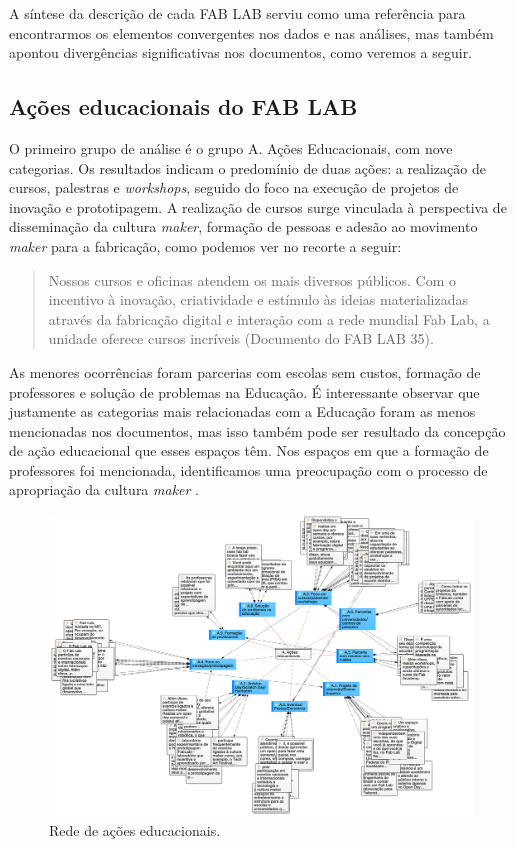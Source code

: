 \documentclass[portuguese]{textolivre}
\begin{document}
A síntese da descrição de cada FAB LAB serviu como uma referência para encontrarmos os elementos convergentes nos dados e nas análises, mas também apontou divergências significativas nos documentos, como veremos a seguir.

\subsection{Ações educacionais do FAB LAB}\label{sec-formato}
O primeiro grupo de análise é o grupo A. Ações Educacionais, com nove categorias. Os resultados indicam o predomínio de duas ações: a realização de cursos, palestras e \textit{workshops}, seguido do foco na execução de projetos de inovação e prototipagem. A realização de cursos surge vinculada à perspectiva de disseminação da cultura \textit{maker}, formação de pessoas e adesão ao movimento \textit{maker} para a fabricação, como podemos ver no recorte a seguir:

\begin{quote}
    Nossos cursos e oficinas atendem os mais diversos públicos. Com o incentivo à inovação, criatividade e estímulo às ideias materializadas através da fabricação digital e interação com a rede mundial Fab Lab, a unidade oferece cursos incríveis (Documento do FAB LAB 35).
\end{quote}

As menores ocorrências foram parcerias com escolas sem custos, formação de professores e solução de problemas na Educação. É interessante observar que justamente as categorias mais relacionadas com a Educação foram as menos mencionadas nos documentos, mas isso também pode ser resultado da concepção de ação educacional que esses espaços têm. Nos espaços em que a formação de professores foi mencionada, identificamos uma preocupação com o processo de apropriação da cultura \textit{maker} .

\begin{figure}[htbp]
\centering
\begin{minipage}{\textwidth}
\includegraphics[width=\linewidth]{Fig3.png}
\caption{Rede de ações educacionais.}
\label{fig3}
\end{minipage}
\end{figure}
\end{document}
